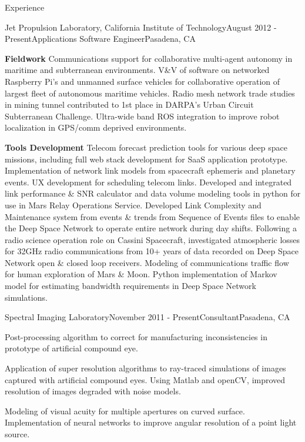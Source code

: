\documentclass{resume} %
\begin{document}
\begin{rSection}{Experience}
\begin{rSubsection}{Jet Propulsion Laboratory, California Institute of Technology}{August 2012 - Present}{Applications Software Engineer}{Pasadena, CA}
\item \textbf{Fieldwork} Communications support for collaborative multi-agent autonomy in maritime and subterranean environments. V\&V of software on networked Raspberry Pi’s and unmanned surface vehicles for collaborative operation of largest fleet of autonomous maritime vehicles. Radio mesh network trade studies in mining tunnel contributed to 1st place in DARPA’s Urban Circuit Subterranean Challenge. Ultra-wide band ROS integration to improve robot localization in GPS/comm deprived environments.


\item \textbf{Tools Development} Telecom forecast prediction tools for various deep space missions, including full web stack development for SaaS application prototype. Implementation of network link models from spacecraft ephemeris and planetary events. UX development for scheduling telecom links. Developed and integrated link performance \& SNR calculator and data volume modeling tools in python for use in Mars Relay Operations Service. Developed Link Complexity and Maintenance system from events \& trends from Sequence of Events files to enable the Deep Space Network to operate entire network during day shifts. Following a radio science operation role on Cassini Spacecraft, investigated atmospheric losses for 32GHz radio communications from 10+ years of data recorded on Deep Space Network open \& closed loop receivers. Modeling of communications traffic flow for human exploration of Mars \& Moon. Python implementation of Markov model for estimating bandwidth requirements in Deep Space Network simulations.

\end{rSubsection}


\begin{rSubsection}{Spectral Imaging Laboratory}{November 2011 - Present}{Consultant}{Pasadena, CA}
\item Post-processing algorithm to correct for manufacturing inconsistencies in prototype of artificial compound eye.
\item Application of super resolution algorithms to ray-traced simulations of images captured with artificial compound eyes. Using Matlab and openCV, improved resolution of images degraded with noise models.
\item Modeling of visual acuity for multiple apertures on curved surface. Implementation of neural networks to improve angular resolution of a point light source. 
\end{rSubsection}




\end{rSection}
\end{document}
